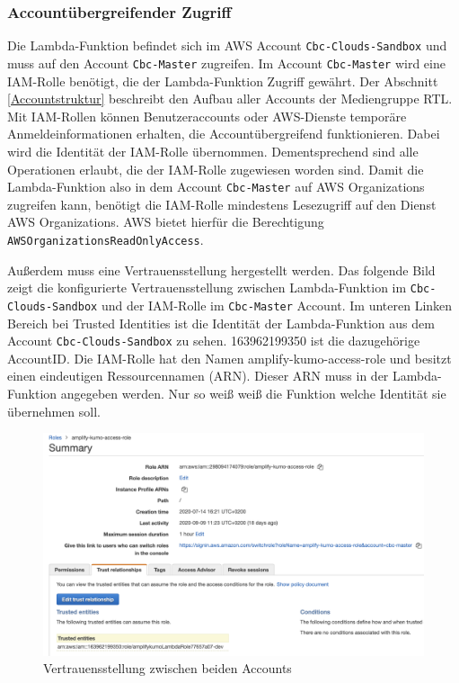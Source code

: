 \subsubsection{Accountübergreifender Zugriff}
\label{AccountübergreifenderZugriff}
Die Lambda-Funktion befindet sich im AWS Account \verb+Cbc-Clouds-Sandbox+ und muss auf den Account \verb+Cbc-Master+ zugreifen.
Im Account \verb+Cbc-Master+ wird eine IAM-Rolle benötigt, die der Lambda-Funktion Zugriff gewährt.
Der Abschnitt \ref{Accountstruktur}  beschreibt den Aufbau aller Accounts der Mediengruppe RTL.
Mit IAM-Rollen können Benutzeraccounts oder AWS-Dienste temporäre Anmeldeinformationen erhalten, die Accountübergreifend funktionieren.
Dabei wird die Identität der IAM-Rolle übernommen.
Dementsprechend sind alle Operationen erlaubt, die der IAM-Rolle zugewiesen worden sind.
Damit die Lambda-Funktion also in dem Account \verb+Cbc-Master+ auf AWS Organizations zugreifen kann, benötigt die IAM-Rolle mindestens Lesezugriff auf den Dienst AWS Organizations.
AWS bietet hierfür die Berechtigung \verb+AWSOrganizationsReadOnlyAccess+.

Außerdem muss eine Vertrauensstellung hergestellt werden.
Das folgende Bild zeigt die konfigurierte Vertrauensstellung zwischen Lambda-Funktion im \verb+Cbc-Clouds-Sandbox+ und der IAM-Rolle im \verb+Cbc-Master+ Account.
Im unteren Linken Bereich bei \glqq Trusted Identities\grqq{} ist die Identität der Lambda-Funktion aus dem Account \verb+Cbc-Clouds-Sandbox+ zu sehen.
163962199350 ist die dazugehörige AccountID.
Die IAM-Rolle hat den Namen \grqq amplify-kumo-access-role\grqq{} und besitzt einen eindeutigen Ressourcennamen (ARN).
Dieser ARN muss in der Lambda-Funktion angegeben werden. Nur so weiß weiß die Funktion welche Identität sie übernehmen soll.

\clearpage

\begin{figure}[htbp]
    \centering
    \includegraphics[width=1.0\textwidth]{50-Implementierung/IAM-Rolle.png}
    \caption{Vertrauensstellung zwischen beiden Accounts}
    \label{fig:meine-grafik}
\end{figure}


